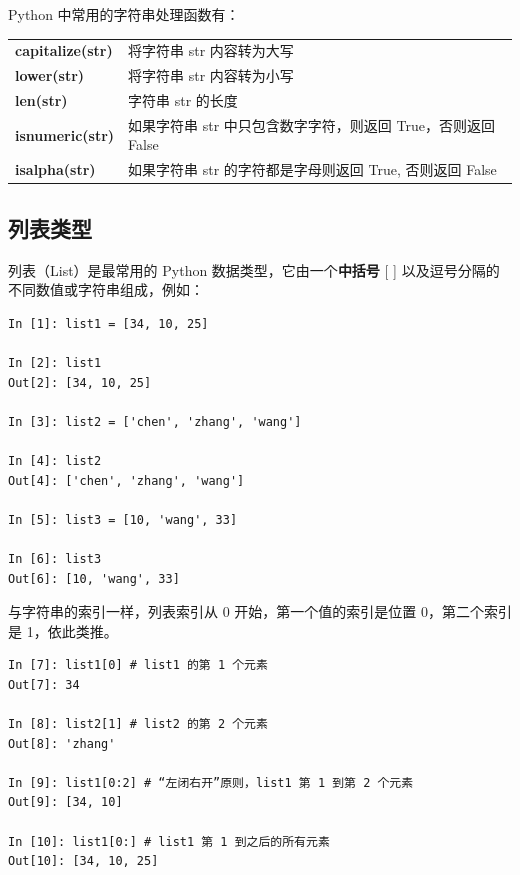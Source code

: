 Python 中常用的字符串处理函数有：

\begin{center}
\begin{tcolorbox} [title = 字符串的常用处理函数]
  \centering
  \begin{tcboutputlisting}
  \begin{tabular}{>{\bfseries}ll}
    capitalize(str) &将字符串 str 内容转为大写\\
    lower(str)&将字符串 str 内容转为小写\\
    len(str) &字符串 str 的长度\\
    isnumeric(str) & 如果字符串 str 中只包含数字字符，则返回 True，否则返回 False\\
  isalpha(str) &如果字符串 str 的字符都是字母则返回 True, 否则返回 False
  \end{tabular}
\end{tcboutputlisting}
\end{tcolorbox}
\end{center}

\subsection{列表类型}

列表（List）是最常用的 Python 数据类型，它由一个\textbf{中括号} [ ] 以及逗号分隔的不同数值或字符串组成，例如：

\begin{lstlisting}[Language=Python]
In [1]: list1 = [34, 10, 25]

In [2]: list1
Out[2]: [34, 10, 25]

In [3]: list2 = ['chen', 'zhang', 'wang']

In [4]: list2
Out[4]: ['chen', 'zhang', 'wang']

In [5]: list3 = [10, 'wang', 33]

In [6]: list3
Out[6]: [10, 'wang', 33]
\end{lstlisting}

与字符串的索引一样，列表索引从 0 开始，第一个值的索引是位置 0，第二个索引是 1，依此类推。

\begin{lstlisting}[Language=Python]
In [7]: list1[0] # list1 的第 1 个元素
Out[7]: 34

In [8]: list2[1] # list2 的第 2 个元素
Out[8]: 'zhang'

In [9]: list1[0:2] # “左闭右开”原则，list1 第 1 到第 2 个元素
Out[9]: [34, 10]

In [10]: list1[0:] # list1 第 1 到之后的所有元素
Out[10]: [34, 10, 25]
\end{lstlisting}

